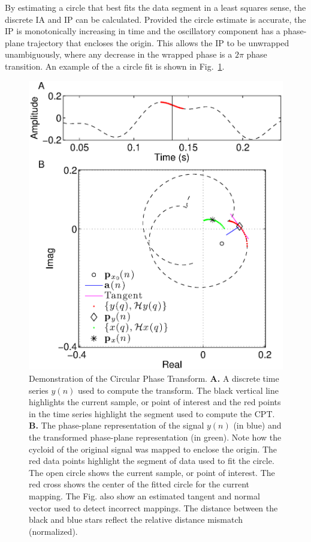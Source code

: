 \documentclass[journal,11pt,a4paper,onecolumn,draftcls]{IEEEtran}
\begin{document}
By estimating a circle that best fits the data segment in a least squares sense, the discrete IA and IP can be calculated. Provided the circle estimate is accurate, the IP is monotonically increasing in time and the oscillatory component has a phase-plane trajectory that encloses the origin. This allows the IP to be unwrapped unambiguously, where any decrease in the wrapped phase is a $2\pi$ phase transition. An example of the a circle fit is shown in Fig.~\ref{fig:MappingDemo}.

\begin{figure}
    \centering
    \includegraphics[scale=0.42]{./Figures/MappingDemonstration.eps}
    \caption[MappingDemo]{Demonstration of the Circular Phase Transform. \textbf{A.} A discrete time series $y(n)$ used to compute the transform. The black vertical line highlights the current sample, or point of interest and the red points in the time series highlight the segment used to compute the CPT. \textbf{B.} The phase-plane representation of the signal $y(n)$ (in blue) and the transformed phase-plane representation (in green). Note how the cycloid of the original signal was mapped to enclose the origin. The red data points highlight the segment of data used to fit the circle. The open circle shows the current sample, or point of interest. The red cross shows the center of the fitted circle for the current mapping. The Fig. also show an estimated tangent and normal vector used to detect incorrect mappings. The distance between the black and blue stars reflect the relative distance mismatch (normalized).}
    \label{fig:MappingDemo}
\end{figure}
\end{document}
